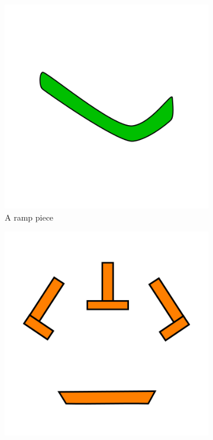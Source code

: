 \documentclass{l4proj}
\begin{document}
\begin{figure}
    \centering
    \begin{subfigure}[b]{0.3\textwidth}
        \includegraphics[width=1\textwidth]{images/ramp.png}
        \caption{A ramp piece}
        \label{fig:ramp}
    \end{subfigure}
    \begin{subfigure}[b]{0.3\textwidth}
        \includegraphics[width=1\textwidth]{images/crossover.png}

\end{subfigure}
\end{figure}
\end{document}
